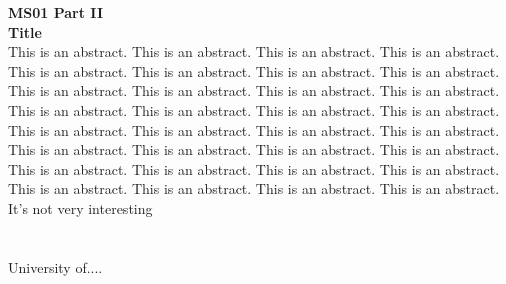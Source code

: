 \begin{multicols}{2}
\noindent\textbf{MS01 Part II}\\
\textbf{Title}\\
This is an abstract. This is an abstract. This is an abstract. This is an abstract. This is an abstract. This is an abstract. This is an abstract. This is an abstract. This is an abstract. This is an abstract. This is an abstract. This is an abstract. This is an abstract. This is an abstract. This is an abstract. This is an abstract. This is an abstract. This is an abstract. This is an abstract. This is an abstract. This is an abstract. This is an abstract. This is an abstract. This is an abstract. This is an abstract. This is an abstract. This is an abstract. This is an abstract. This is an abstract. This is an abstract. This is an abstract. This is an abstract. \\It's not very interesting\\\\
\\
University of....\\
\\\\

\end{multicols}


